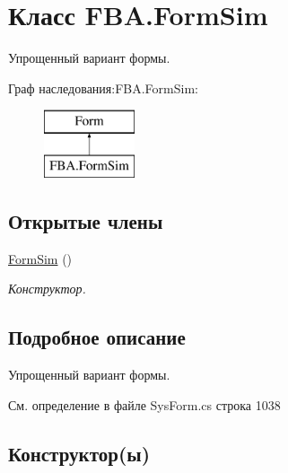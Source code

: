 \hypertarget{class_f_b_a_1_1_form_sim}{}\section{Класс F\+B\+A.\+Form\+Sim}
\label{class_f_b_a_1_1_form_sim}


Упрощенный вариант формы.  


Граф наследования\+:F\+B\+A.\+Form\+Sim\+:\begin{figure}[H]
\begin{center}
\leavevmode
\includegraphics[height=2.000000cm]{class_f_b_a_1_1_form_sim}
\end{center}
\end{figure}
\subsection*{Открытые члены}
\begin{DoxyCompactItemize}
\item 
\mbox{\hyperlink{class_f_b_a_1_1_form_sim_a30db9e8ff433135b498d6b785fb7135d}{Form\+Sim}} ()
\begin{DoxyCompactList}\small\item\em Конструктор. \end{DoxyCompactList}\end{DoxyCompactItemize}


\subsection{Подробное описание}
Упрощенный вариант формы. 



См. определение в файле Sys\+Form.\+cs строка 1038



\subsection{Конструктор(ы)}
\mbox{\label{class_f_b_a_1_1_form_sim_a30db9e8ff433135b498d6b785fb7135d}} 
